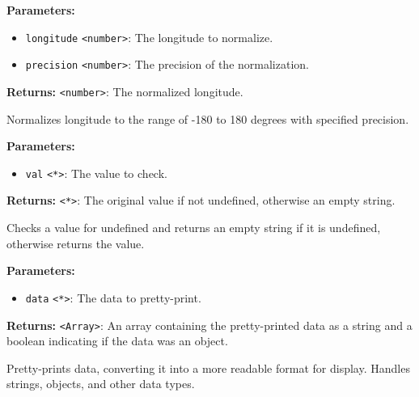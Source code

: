 \documentclass[12pt,a4paper]{article}
\begin{document}
\noindent \textbf{Parameters:}
\begin{itemize}
  \item \texttt{longitude} \texttt{<number>}: The longitude to normalize.
  \item \texttt{precision} \texttt{<number>}: The precision of the normalization.
\end{itemize}

\noindent \textbf{Returns:} \texttt{<number>}: The normalized longitude.

\noindent Normalizes longitude to the range of -180 to 180 degrees with specified precision.

\vspace{5mm}
\noindent {}


\noindent \textbf{Parameters:}
\begin{itemize}
  \item \texttt{val} \texttt{<*>}: The value to check.
\end{itemize}

\noindent \textbf{Returns:} \texttt{<*>}: The original value if not undefined, otherwise an empty string.

\noindent Checks a value for undefined and returns an empty string if it is undefined, otherwise returns the value.

\vspace{5mm}
\noindent {}


\noindent \textbf{Parameters:}
\begin{itemize}
  \item \texttt{data} \texttt{<*>}: The data to pretty-print.
\end{itemize}

\noindent \textbf{Returns:} \texttt{<Array>}: An array containing the pretty-printed data as a string and a boolean indicating if the data was an object.

\noindent Pretty-prints data, converting it into a more readable format for display. Handles strings, objects, and other data types.

\vspace{5mm}
\noindent {}
\end{document}

